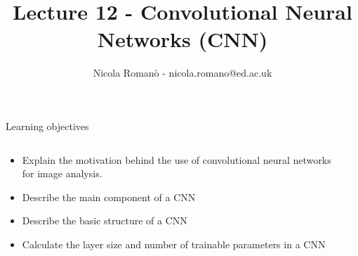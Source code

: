 \documentclass[9pt, aspectratio=169]{beamer}
\author{Nicola Roman\`o - nicola.romano@ed.ac.uk}
\title{Lecture 12 - Convolutional Neural Networks (CNN)}
\date{}
\begin{document}

\begin{frame}
    \titlepage
\end{frame}

\begin{frame}
    {Learning objectives}
    \begin{columns}
        \begin{column}{0.8\textwidth}
            \begin{itemize}
                \item Explain the motivation behind the use of convolutional neural networks for image analysis.
                \item Describe the main component of a CNN
                \item Describe the basic structure of a CNN
                \item Calculate the layer size and number of trainable parameters in a CNN
            \end{itemize}
        \end{column}
        \begin{column}{0.2\textwidth}

\end{column}
\end{columns}
\end{frame}
\end{document}
